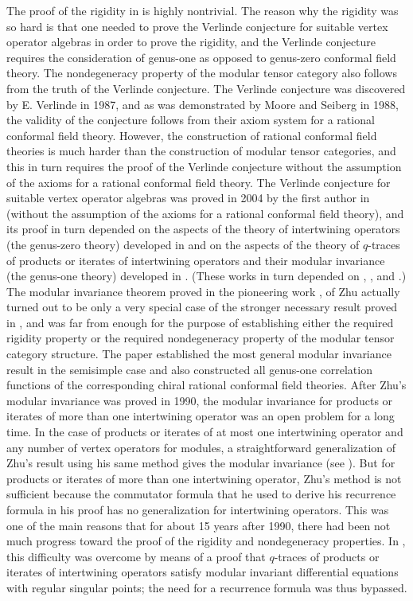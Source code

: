 \documentclass[12pt]{article}
\begin{document}
The proof of the rigidity in \cite{rigidity} is highly nontrivial.
The reason why the rigidity was so hard is that one needed to prove
the Verlinde conjecture for suitable vertex operator algebras in order
to prove the rigidity, and the Verlinde conjecture requires the
consideration of genus-one as opposed to genus-zero conformal field
theory. The nondegeneracy property of the modular tensor category also
follows from the truth of the Verlinde conjecture.  The Verlinde
conjecture was discovered by E. Verlinde \cite{V} in 1987, and as was
demonstrated by Moore and Seiberg \cite{MS1} \cite{MS} in 1988, the
validity of the conjecture follows from their axiom system for a
rational conformal field theory.  However, the construction of
rational conformal field theories is much harder than the construction
of modular tensor categories, and this in turn requires the proof of
the Verlinde conjecture without the assumption of the axioms for a
rational conformal field theory.  The Verlinde conjecture for suitable
vertex operator algebras was proved in 2004 by the first author in
\cite{HVerlindeconjecture} (without the assumption of the axioms for a
rational conformal field theory), and its proof in turn depended on
the aspects of the theory of intertwining operators (the genus-zero
theory) developed in \cite{diff-eqn} and on the aspects of the theory
of $q$-traces of products or iterates of intertwining operators and
their modular invariance (the genus-one theory) developed in
\cite{Hmodular}.  (These works in turn depended on \cite{tensor1},
\cite{tensor2}, \cite{tensor3} and \cite{tensor4}.)  The modular
invariance theorem proved in the pioneering work \cite{Zhu1},
\cite{Zhu} of Zhu actually turned out to be only a very special case
of the stronger necessary result proved in \cite{Hmodular}, and was
far from enough for the purpose of establishing either the required
rigidity property or the required nondegeneracy property of the
modular tensor category structure.  The paper \cite{Hmodular}
established the most general modular invariance result in the
semisimple case and also constructed all genus-one correlation
functions of the corresponding chiral rational conformal field
theories. After Zhu's modular invariance was proved in 1990, the
modular invariance for products or iterates of more than one
intertwining operator was an open problem for a long time.  In the
case of products or iterates of at most one intertwining operator and
any number of vertex operators for modules, a straightforward
generalization of Zhu's result using his same method gives the modular
invariance (see \cite{M1}).  But for products or iterates of more than
one intertwining operator, Zhu's method is not sufficient because the
commutator formula that he used to derive his recurrence formula in
his proof has no generalization for intertwining operators. This was
one of the main reasons that for about 15 years after 1990, there had
been not much progress toward the proof of the rigidity and
nondegeneracy properties. In \cite{Hmodular}, this difficulty was
overcome by means of a proof that $q$-traces of products or iterates
of intertwining operators satisfy modular invariant differential
equations with regular singular points; the need for a recurrence
formula was thus bypassed.
\end{document}
